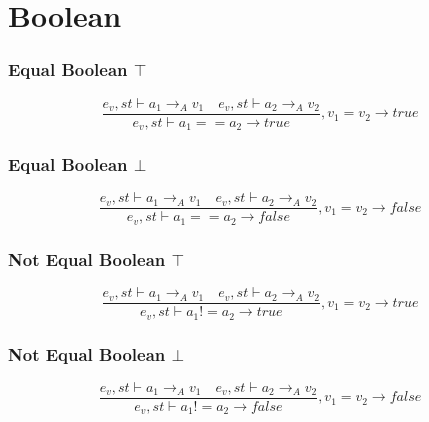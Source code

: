 \section*{Boolean}
\subsubsection{Equal Boolean $\top$}
\begin{equation}
	\frac { { e }_{ v },st\vdash { a }_{ 1 }{ \rightarrow  }_{ A }{ v }_{ 1 }\quad { e }_{ v },st\vdash { a }_{ 2 }{ \rightarrow  }_{ A }{ v }_{ 2 } }{ { e }_{ v },st\vdash { a }_{ 1 }=={ a }_{ 2 }{ \rightarrow  }true } ,{ v }_{ 1 }={ v }_{ 2 }\rightarrow true
\end{equation}

\subsubsection{Equal Boolean $\bot$}
\begin{equation}
	\frac { { e }_{ v },st\vdash { a }_{ 1 }{ \rightarrow  }_{ A }{ v }_{ 1 }\quad { e }_{ v },st\vdash { a }_{ 2 }{ \rightarrow  }_{ A }{ v }_{ 2 } }{ { e }_{ v },st\vdash { a }_{ 1 }=={ a }_{ 2 }{ \rightarrow  }false } ,{ v }_{ 1 }={ v }_{ 2 }\rightarrow false
\end{equation}

\subsubsection{Not Equal Boolean $\top$}
\begin{equation}
	\frac { { e }_{ v },st\vdash { a }_{ 1 }{ \rightarrow  }_{ A }{ v }_{ 1 }\quad { e }_{ v },st\vdash { a }_{ 2 }{ \rightarrow  }_{ A }{ v }_{ 2 } }{ { e }_{ v },st\vdash { a }_{ 1 }!={ a }_{ 2 }{ \rightarrow  }true } ,{ v }_{ 1 }={ v }_{ 2 }\rightarrow true
\end{equation}

\subsubsection{Not Equal Boolean $\bot$}
\begin{equation}
	\frac { { e }_{ v },st\vdash { a }_{ 1 }{ \rightarrow  }_{ A }{ v }_{ 1 }\quad { e }_{ v },st\vdash { a }_{ 2 }{ \rightarrow  }_{ A }{ v }_{ 2 } }{ { e }_{ v },st\vdash { a }_{ 1 }!={ a }_{ 2 }{ \rightarrow  }false } ,{ v }_{ 1 }={ v }_{ 2 }\rightarrow false
\end{equation}

